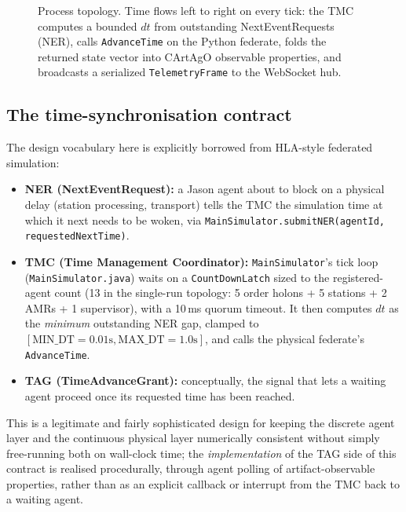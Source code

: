 \documentclass[twocolumn,10pt,a4paper]{article}
\newcommand{\code}[1]{\texttt{\small #1}}
\newcommand{\file}[1]{\texttt{#1}}
\begin{document}
\begin{figure}[t]
\begin{tikzpicture}
\end{tikzpicture}
\caption{Process topology. Time flows left to right on every tick: the TMC computes a bounded $dt$ from outstanding NextEventRequests (NER), calls \code{AdvanceTime} on the Python federate, folds the returned state vector into CArtAgO observable properties, and broadcasts a serialized \code{TelemetryFrame} to the WebSocket hub.}
\label{fig:architecture}
\end{figure}

\subsection{The time-synchronisation contract}
\label{sec:time-sync}
The design vocabulary here is explicitly borrowed from HLA-style federated simulation:

\begin{itemize}
\item \textbf{NER (NextEventRequest):} a Jason agent about to block on a physical delay (station processing, transport) tells the TMC the simulation time at which it next needs to be woken, via \code{MainSimulator.submitNER(agentId, requestedNextTime)}.
\item \textbf{TMC (Time Management Coordinator):} \code{MainSimulator}'s tick loop (\file{MainSimulator.java}) waits on a \code{CountDownLatch} sized to the registered-agent count (13 in the single-run topology: 5 order holons + 5 stations + 2 AMRs + 1 supervisor), with a 10\,ms quorum timeout. It then computes $dt$ as the \emph{minimum} outstanding NER gap, clamped to $[\text{MIN\_DT}=0.01\text{s}, \text{MAX\_DT}=1.0\text{s}]$, and calls the physical federate's \code{AdvanceTime}.
\item \textbf{TAG (TimeAdvanceGrant):} conceptually, the signal that lets a waiting agent proceed once its requested time has been reached.
\end{itemize}

This is a legitimate and fairly sophisticated design for keeping the discrete agent layer and the continuous physical layer numerically consistent without simply free-running both on wall-clock time; the \emph{implementation} of the TAG side of this contract is realised procedurally, through agent polling of artifact-observable properties, rather than as an explicit callback or interrupt from the TMC back to a waiting agent.
\end{document}

